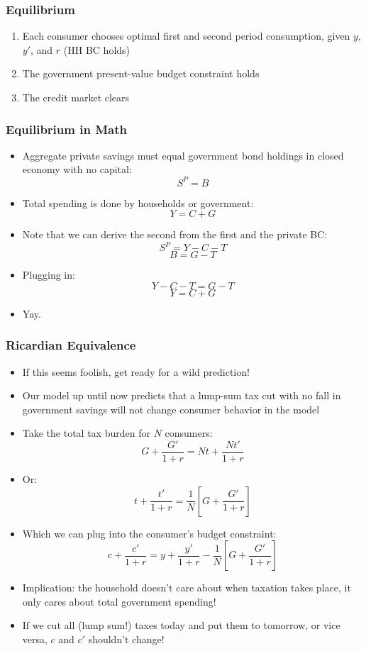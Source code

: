\documentclass{beamer}
\begin{document}
\begin{frame}
\frametitle[alignment=center]{Equilibrium}
\begin{enumerate}
\item Each consumer chooses optimal first and second period consumption, given $y$, $y'$, and $r$ (HH BC holds)
\bigskip
\item The government present-value budget constraint holds
\bigskip
\item The credit market clears
\end{enumerate}
\end{frame}

\begin{frame}
\frametitle[alignment=center]{Equilibrium in Math}
\begin{itemize}
\item Aggregate private savings must equal government bond holdings in closed economy with no capital:
$$S^P=B$$
\item Total spending is done by households or government:  
$$Y=C+G$$
\item Note that we can derive the second from the first and the private BC:
$$S^P=Y-C-T$$
$$B=G-T$$
\item Plugging in:
$$Y-C-T=G-T$$
$$Y=C+G$$
\item Yay.  
\end{itemize}
\end{frame}

\begin{frame}
\frametitle[alignment=center]{Ricardian Equivalence}
\begin{itemize}
\item If this seems foolish, get ready for a wild prediction!
\smallskip
\item Our model up until now predicts that a lump-sum tax cut with no fall in government savings will not change consumer behavior in the model
\smallskip
\item Take the total tax burden for $N$ consumers:
$$G+\frac{G'}{1+r}=Nt+\frac{Nt'}{1+r}$$
\item Or:
$$t+\frac{t'}{1+r}=\frac{1}{N}\left[G+\frac{G'}{1+r}\right]$$
\item Which we can plug into the consumer's budget constraint:
$$c+\frac{c'}{1+r}=y+\frac{y'}{1+r}-\frac{1}{N}\left[G+\frac{G'}{1+r}\right]$$
\item Implication:  the household doesn't care about when taxation takes place, it only cares about total government spending!
\smallskip
\item If we cut all (lump sum!) taxes today and put them to tomorrow, or vice versa, $c$ and $c'$ shouldn't change!
\end{itemize}
\end{frame}
\end{document}
